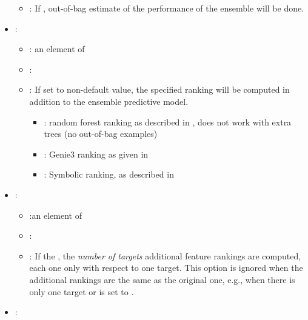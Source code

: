\begin{itemize}
\begin{itemize}
                \item \optionDescrption{}:  If , out-of-bag estimate of the performance of the ensemble will be done.
           \end{itemize}
    \item {}:
           \begin{itemize}
                \item \optionPossibleValues{}:  an element of 
                \item \optionDefaultValue{}: 
                \item \optionDescrption{}: If set to non-default value, the specified ranking will be computed in addition to the ensemble predictive model.
                    \begin{itemize}
                        \item {}: random forest ranking as described in \cite{petkovic2017-ensemble-fr}, does not work with extra trees (no out-of-bag examples)
                        \item {}: Genie3 ranking as given in \cite{petkovic2017-ensemble-fr}
                        \item {}: Symbolic ranking, as described in \cite{petkovic2017-ensemble-fr}
                    \end{itemize}
           \end{itemize}
    \item {}:
           \begin{itemize}
                \item \optionPossibleValues{}:an element of  
                \item \optionDefaultValue{}: 
                \item \optionDescrption{}: If the , the \textit{number of targets} additional feature rankings are computed, each one only with respect to one target.
                This option is ignored when the additional rankings are the same as the original one, e.g., when there is only one target or  is set to .
           \end{itemize}
    \item {}:

\end{itemize}
